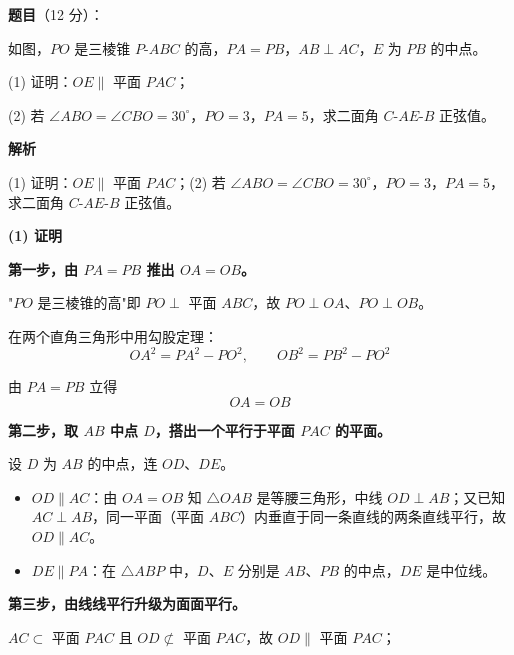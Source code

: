\begin{answer}

\textbf{题目}（12 分）：

如图，$PO$ 是三棱锥 $P\text{-}ABC$ 的高，$PA=PB$，$AB\perp AC$，$E$ 为 $PB$ 的中点。
\nopagebreak[4]
\begin{center}\end{center}
\nopagebreak[4]
  (1) 证明：$OE\parallel$ 平面 $PAC$；

  (2) 若 $\angle ABO=\angle CBO=30^\circ$，$PO=3$，$PA=5$，求二面角 $C\text{-}AE\text{-}B$ 正弦值。

\textbf{解析}

(1) 证明：$OE\parallel$ 平面 $PAC$；(2) 若 $\angle ABO=\angle CBO=30^\circ$，$PO=3$，$PA=5$，求二面角 $C\text{-}AE\text{-}B$ 正弦值。

\par\medskip

\textbf{(1) 证明}

\textbf{第一步，由 $PA=PB$ 推出 $OA=OB$。}

"$PO$ 是三棱锥的高"即 $PO\perp$ 平面 $ABC$，故 $PO\perp OA$、$PO\perp OB$。

在两个直角三角形中用勾股定理：
\nopagebreak[4]
\[OA^{2}=PA^{2}-PO^{2},\qquad OB^{2}=PB^{2}-PO^{2}\]

由 $PA=PB$ 立得
\nopagebreak[4]
\[OA=OB\]

\textbf{第二步，取 $AB$ 中点 $D$，搭出一个平行于平面 $PAC$ 的平面。}

设 $D$ 为 $AB$ 的中点，连 $OD$、$DE$。

\begin{itemize}
\item \textbf{$OD\parallel AC$}：由 $OA=OB$ 知 $\triangle OAB$ 是等腰三角形，中线 $OD\perp AB$；又已知 $AC\perp AB$，同一平面（平面 $ABC$）内垂直于同一条直线的两条直线平行，故 $OD\parallel AC$。
\end{itemize}

\begin{itemize}
\item \textbf{$DE\parallel PA$}：在 $\triangle ABP$ 中，$D$、$E$ 分别是 $AB$、$PB$ 的中点，$DE$ 是中位线。
\end{itemize}

\textbf{第三步，由线线平行升级为面面平行。}

$AC\subset$ 平面 $PAC$ 且 $OD\not\subset$ 平面 $PAC$，故 $OD\parallel$ 平面 $PAC$；


\end{answer}
